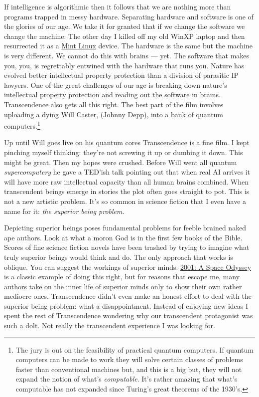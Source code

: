 If intelligence is algorithmic then it follows that we are nothing more
than programs trapped in messy hardware. Separating hardware and
software is one of the glories of our age. We take it for granted that
if we change the software we change the machine. The other day I killed
off my old WinXP laptop and then resurrected it as a
\href{http://www.linuxmint.com/}{Mint Linux} device. The hardware is the
same but the machine is very different. We cannot do this with brains
--- yet. The software that makes you, you, is regrettably entwined with
the hardware that runs you. Nature has evolved better intellectual
property protection than a division of parasitic IP lawyers. One of the
great challenges of our age is breaking down nature's intellectual
property protection and reading out the software in brains.
Transcendence also gets all this right. The best part of the film
involves uploading a dying Will Caster, (Johnny Depp), into a bank of
quantum computers.\footnote{
The jury is out on the feasibility of practical quantum
computers. If quantum computers can be made to work they will solve
certain classes of problems faster than conventional machines but, and
this is a big but, they will not expand the notion of what's
\emph{computable}. It's rather amazing that what's computable has not
expanded since Turing's great theorems of the 1930's.
}

Up until Will goes live on his quantum cores Transcendence is a fine
film. I kept pinching myself thinking: they're not screwing it up or
dumbing it down. This might be great. Then my hopes were crushed.
Before Will went all quantum \emph{supercomputery} he gave a TED'ish
talk pointing out that when real AI arrives it will have more raw
intellectual capacity than all human brains combined. When transcendent
beings emerge in stories the plot often goes straight to pot. This is
not a new artistic problem. It's so common in science fiction that I
even have a name for it: \emph{the superior being problem.}

Depicting superior beings poses fundamental problems for feeble brained
naked ape authors. Look at what a moron God is in the first few books of
the Bible. Scores of fine science fiction novels have been trashed by
trying to imagine what truly superior beings would think and do. The
only approach that works is oblique. You can suggest the workings of
superior minds. \href{http://www.imdb.com/title/tt0062622/}{2001: A
Space Odyssey} is a classic example of doing this right, but for reasons
that escape me, many authors take on the inner life of superior minds
only to show their own rather mediocre ones. Transcendence didn't even
make an honest effort to deal with the superior being
problem: what a disappointment. Instead of enjoying new ideas I spent
the rest of Transcendence wondering why our transcendent protagonist was
such a dolt. Not really the transcendent experience I was looking for.

